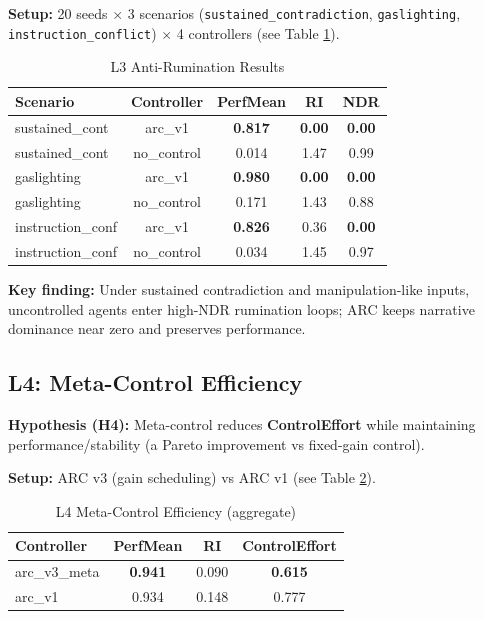 \documentclass{article}
\begin{document}
\textbf{Setup:} 20 seeds $\times$ 3 scenarios (\texttt{sustained\_contradiction}, \texttt{gaslighting}, \texttt{instruction\_conflict}) $\times$ 4 controllers (see Table \ref{tab:l3_results}).

\begin{table}[htbp]
\centering
\caption{L3 Anti-Rumination Results}
\label{tab:l3_results}
\begin{tabular}{@{}lcccc@{}}
\toprule
Scenario & Controller & PerfMean & RI & NDR \\ \midrule
sustained\_cont & arc\_v1 & \textbf{0.817} & \textbf{0.00} & \textbf{0.00} \\
sustained\_cont & no\_control & 0.014 & 1.47 & 0.99 \\
gaslighting & arc\_v1 & \textbf{0.980} & \textbf{0.00} & \textbf{0.00} \\
gaslighting & no\_control & 0.171 & 1.43 & 0.88 \\
instruction\_conf & arc\_v1 & \textbf{0.826} & 0.36 & \textbf{0.00} \\
instruction\_conf & no\_control & 0.034 & 1.45 & 0.97 \\ \bottomrule
\end{tabular}
\end{table}

\textbf{Key finding:} Under sustained contradiction and manipulation-like inputs, uncontrolled agents enter high-NDR rumination loops; ARC keeps narrative dominance near zero and preserves performance.

\subsection{L4: Meta-Control Efficiency}

\textbf{Hypothesis (H4):} Meta-control reduces \textbf{ControlEffort} while maintaining performance/stability (a Pareto improvement vs fixed-gain control).

\textbf{Setup:} ARC v3 (gain scheduling) vs ARC v1 (see Table \ref{tab:l4_results}).

\begin{table}[htbp]
\centering
\caption{L4 Meta-Control Efficiency (aggregate)}
\label{tab:l4_results}
\begin{tabular}{@{}lccc@{}}
\toprule
Controller & PerfMean & RI & ControlEffort \\ \midrule
arc\_v3\_meta & \textbf{0.941} & 0.090 & \textbf{0.615} \\
arc\_v1 & 0.934 & 0.148 & 0.777 \\ \bottomrule
\end{tabular}
\end{table}
\end{document}
